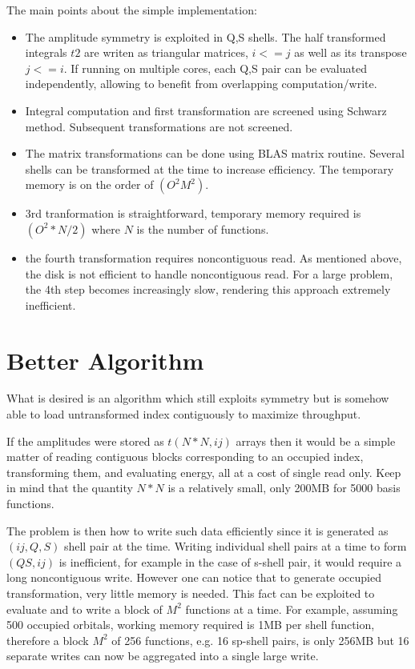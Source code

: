 \documentclass[12pt]{article} \usepackage[margin=1in]{geometry}
\begin{document}
The main points about the simple implementation:
\begin{itemize}
\item The amplitude symmetry is exploited in Q,S shells.  The half
  transformed integrals $t2$ are writen as triangular matrices, $i <=
  j$ as well as its transpose $j <= i$.  If running on multiple cores,
  each Q,S pair can be evaluated independently, allowing to benefit
  from overlapping computation/write.
\item Integral computation and first transformation are screened
  using Schwarz method.  Subsequent transformations are not screened.
\item The matrix transformations can be done using BLAS matrix
  routine.  Several shells can be transformed at the time to increase
  efficiency.  The temporary memory is on the order of $(O^2 M^2)$.
\item 3rd tranformation is straightforward, temporary memory required
  is $(O^2*N/2)$ where $N$ is the number of functions.
\item the fourth transformation requires noncontiguous read.  As
  mentioned above, the disk is not efficient to handle noncontiguous
  read.  For a large problem, the 4th step becomes increasingly slow,
  rendering this approach extremely inefficient.
\end{itemize}

\section{Better Algorithm}
What is desired is an algorithm which still exploits symmetry but is
somehow able to load untransformed index contiguously to maximize
throughput.

If the amplitudes were stored as $t(N*N,ij)$ arrays then it would be a simple
matter of reading contiguous blocks corresponding to an occupied
index, transforming them, and evaluating energy, all at a cost of
single read only.  Keep in mind that the quantity $N*N$ is a
relatively small, only 200MB for 5000 basis functions.

The problem is then how to write such data efficiently since it is
generated as $(ij,Q,S)$ shell pair at the time.  Writing individual shell pairs
at a time to form $(QS,ij)$ is inefficient, for example in the case of
s-shell pair, it would require a long noncontiguous write.  However
one can notice that to generate occupied transformation, very little
memory is needed.  This fact can be exploited to evaluate and to write
a block of $M^2$ functions at a time.  For example, assuming 500 occupied
orbitals, working memory required is 1MB per shell function, therefore
a block $M^2$ of 256 functions, e.g. 16 sp-shell pairs, is only 256MB but 16
separate writes can now be aggregated into a single large write.
\end{document}

